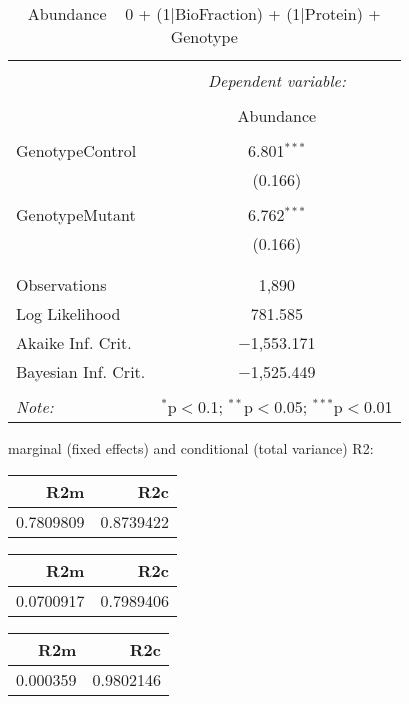 \documentclass[11pt]{report}
\begin{document}
\begin{table}[!htbp] \centering 
  \caption{Abundance ~ 0 + (1|BioFraction) + (1|Protein) + Genotype} 
  \label{} 
\begin{tabular}{@{\extracolsep{5pt}}lc} 
\\[-1.8ex]\hline 
\hline \\[-1.8ex] 
 & \multicolumn{1}{c}{\textit{Dependent variable:}} \\ 
\cline{2-2} 
\\[-1.8ex] & Abundance \\ 
\hline \\[-1.8ex] 
 GenotypeControl & 6.801$^{***}$ \\ 
  & (0.166) \\ 
  & \\ 
 GenotypeMutant & 6.762$^{***}$ \\ 
  & (0.166) \\ 
  & \\ 
\hline \\[-1.8ex] 
Observations & 1,890 \\ 
Log Likelihood & 781.585 \\ 
Akaike Inf. Crit. & $-$1,553.171 \\ 
Bayesian Inf. Crit. & $-$1,525.449 \\ 
\hline 
\hline \\[-1.8ex] 
\textit{Note:}  & \multicolumn{1}{r}{$^{*}$p$<$0.1; $^{**}$p$<$0.05; $^{***}$p$<$0.01} \\ 
\end{tabular} 
\end{table} 
marginal (fixed effects) and conditional (total variance) R2:

\begin{tabular}{r|r}
\hline
R2m & R2c\\
\hline
0.7809809 & 0.8739422\\
\hline
\end{tabular}

\begin{tabular}{r|r}
\hline
R2m & R2c\\
\hline
0.0700917 & 0.7989406\\
\hline
\end{tabular}

\begin{tabular}{r|r}
\hline
R2m & R2c\\
\hline
0.000359 & 0.9802146\\
\hline
\end{tabular}
\end{document}
